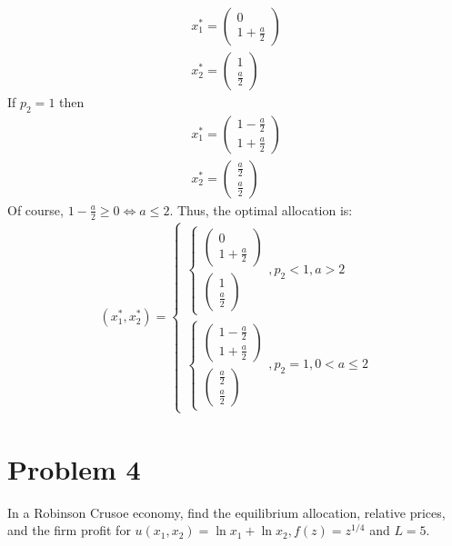 \documentclass[a4paper]{article}
\begin{document}
\begin{align*}
x_1^* = \begin{pmatrix}
0\\
1 + \frac{a}{2}
\end{pmatrix}\\
x_2^* = \begin{pmatrix}
1\\
\frac{a}{2}
\end{pmatrix}
\end{align*}
If $p_2 = 1$ then
\begin{align*}
x_1^* = \begin{pmatrix}
1 - \frac{a}{2}\\
1 + \frac{a}{2}
\end{pmatrix}\\
x_2^* = \begin{pmatrix}
\frac{a}{2}\\
\frac{a}{2}
\end{pmatrix}
\end{align*}
Of course, $1 - \frac{a}{2} \ge 0 \iff a \le 2$. Thus, the optimal allocation is:
\begin{align*}
(x_1^*, x_2^*) = \begin{cases}
\begin{cases}
\begin{pmatrix}
0\\
1 + \frac{a}{2}
\end{pmatrix}\\
\begin{pmatrix}
1\\
\frac{a}{2}
\end{pmatrix}
\end{cases}, p_2 < 1, a > 2\\
\begin{cases}
\begin{pmatrix}
1 - \frac{a}{2}\\
1 + \frac{a}{2}
\end{pmatrix}\\
\begin{pmatrix}
\frac{a}{2}\\
\frac{a}{2}
\end{pmatrix}
\end{cases}, p_2 = 1, 0 < a \le 2
\end{cases}
\end{align*}
\section*{Problem 4}
In a Robinson Crusoe economy, find the equilibrium allocation, relative prices, and the
firm profit for $u(x_1, x_2) = \ln x_1 + \ln x_2, f(z) = z^{1/4}$ and $L = 5$.
\end{document}
